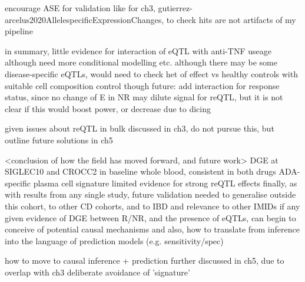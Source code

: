 \begin{outline}
    \2 encourage ASE for validation like for ch3, gutierrez-arcelus2020AllelespecificExpressionChanges, to check hits are not artifacts of my pipeline

    \2 in summary, little evidence for interaction of eQTL with anti-TNF useage
        \3 although need more conditional modelling etc.
        \3 although there may be some disease-specific eQTLs, would need to check het of effect vs healthy controls with suitable cell composition control though
        \3 future: add interaction for response status, since no change of E in NR may dilute signal for reQTL, but it is not clear if this would boost power, or decrease due to dicing

    \2 given issues about reQTL in bulk discussed in ch3, do not pursue this, but outline future solutions in ch5


\1 <conclusion of how the field has moved forward, and future work>
    \2 DGE at SIGLEC10 and CROCC2 in baseline whole blood, consistent in both drugs
    \2 ADA-specific plasma cell signature
    \2 limited evidence for strong reQTL effects
    \2 finally, as with results from any single study, future validation needed to generalise outside this cohort, to other CD cohorts, and to IBD and relevance to other IMIDs if any
    \2 given evidence of DGE between R/NR, and the presence of eQTLs, can begin to conceive of potential causal mechanisms 
    \2 and also, how to translate from inference into the language of prediction models (e.g. sensitivity/spec)

\1 how to move to causal inference + prediction further discussed in ch5, due to overlap with ch3
    \2 deliberate avoidance of 'signature'


\end{outline}
